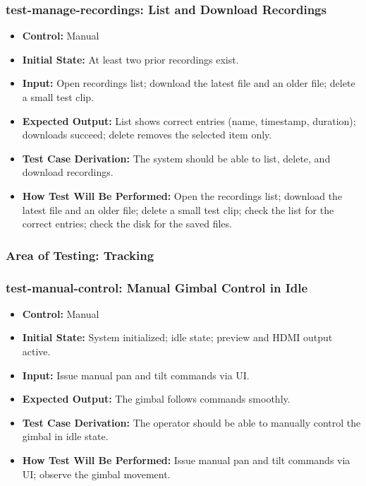 \documentclass[12pt, titlepage]{article}
\begin{document}
\subsubsection*{test-manage-recordings: List and Download Recordings}
\begin{itemize}
  \item \textbf{Control:} Manual
  \item \textbf{Initial State:} At least two prior recordings exist.
  \item \textbf{Input:} Open recordings list; download the latest file and an older file; delete a small test clip.
  \item \textbf{Expected Output:} List shows correct entries (name, timestamp, duration); downloads succeed; delete removes the selected item only.
  \item \textbf{Test Case Derivation:} The system should be able to list, delete, and download recordings.
  \item \textbf{How Test Will Be Performed:} Open the recordings list; download the latest file and an older file; delete a small test clip; check the list for the correct entries; check the disk for the saved files.
\end{itemize}

\subsubsection{Area of Testing: Tracking}

\subsubsection*{test-manual-control: Manual Gimbal Control in Idle}
\begin{itemize}
  \item \textbf{Control:} Manual
  \item \textbf{Initial State:} System initialized; idle state; preview and HDMI output active.
  \item \textbf{Input:} Issue manual pan and tilt commands via UI.
  \item \textbf{Expected Output:} The gimbal follows commands smoothly.
  \item \textbf{Test Case Derivation:} The operator should be able to manually control the gimbal in idle state.
  \item \textbf{How Test Will Be Performed:} Issue manual pan and tilt commands via UI; observe the gimbal movement.
\end{itemize}
\end{document}
